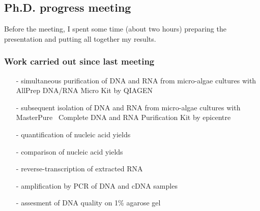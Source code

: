 \subsection{Ph.D. progress meeting}
\label{task:20180221_cj0}

Before the meeting, I spent some time (about two hours) preparing the presentation and putting all together my results.

\subsubsection{Work carried out since last meeting}

\begin{itemize}
    \item[-] simultaneous purification of DNA and RNA from micro-algae cultures with AllPrep DNA/RNA Micro Kit by QIAGEN
    \item[-] subsequent isolation of DNA and RNA from micro-algae cultures with MasterPure\texttrademark~ Complete DNA and RNA Purification Kit by epicentre
    \item[-] quantification of nucleic acid yields
    \item[-] comparison of nucleic acid yields
    \item[-] reverse-transcription of extracted RNA
    \item[-] amplification by PCR of DNA and cDNA samples
    \item[-] assesment of DNA quality on 1\% agarose gel
\end{itemize}

